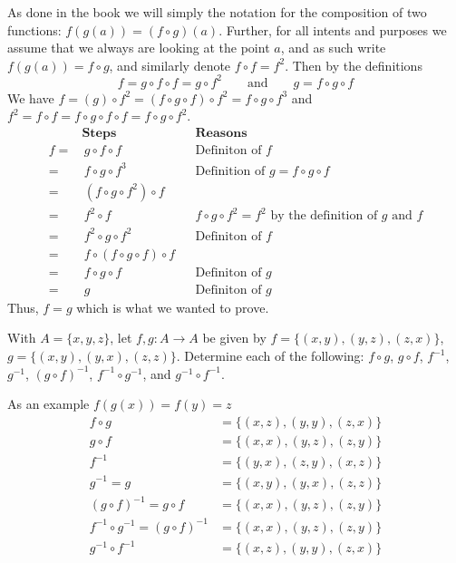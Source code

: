 \documentclass[a4paper, english, 12pt]{article} %
\begin{document}
\begin{answer}
  As done in the book we will simply the notation for the composition of two
  functions: $f(g(a)) = (f \circ g)(a)$. Further, for all intents and purposes
  we assume that we always are looking at the point $a$, and as such write
  $f(g(a)) = f \circ g$, and similarly denote $f \circ f = f^2$. Then by the
  definitions
  \begin{equation*}
    f = g \circ f \circ f = g \circ f^2
    \qquad
    \text{and}
    \qquad
    g = f \circ g \circ f 
  \end{equation*}
  We have $f = (g) \circ f^2 = (f \circ g \circ f) \circ f^2 = f \circ g \circ
  f^3$ and $f^2 =
  f \circ f = f \circ g \circ f \circ f = f \circ g \circ f^2$.
  \begin{align*}
      & \textbf{Steps} && \textbf{Reasons} \\
    f = & \, g \circ f \circ f 
     && \text{Definiton of $f$}  \\
    = & \, f \circ g \circ f^3
     && \text{Definition of $g = f \circ g \circ f$} \\
    = & \, (f \circ g \circ f^2) \circ f
     &&  \\
    = & \, f^2 \circ f
     && \text{$f \circ g \circ f^2 = f^2$ by the definition of $g$ and $f$} \\
    = & \, f^2 \circ g \circ f^2
     && \text{Definiton of $f$} \\
    = & \, f \circ (f \circ g \circ f) \circ f 
     &&  \\
    = & \, f \circ g \circ f 
     && \text{Definiton of $g$} \\
    = & \, g
     && \text{Definiton of $g$}
  \end{align*}
  Thus, $f = g$ which is what we wanted to prove.
\end{answer}

\begin{problem}[27]
  With $A = \{x, y, z\}$, let $f, g \colon A \to A$ be given by $f = \{(x,y),
  (y,z), (z,x)\}$, $g = \{(x, y), (y, x), (z, z)\}$. Determine each of the
  following: $f \circ g$, $g \circ f$, $f^{-1}$, $g^{-1}$, $(g \circ f)^{-1}$,
  $f^{-1}\circ g^{-1}$, and $g^{-1} \circ f^{-1}$.
\end{problem}

\begin{answer}
  As an example $f(g(x)) = f(y) = z$
  \begin{align*}
    f \circ g & = \{ (x,z), (y, y), (z, x) \} \\
    g \circ f & = \{ (x,x), (y,z), (z,y) \} \\
    f^{-1} & = \{(y,x), (z,y), (x,z)\} \\
    g^{-1} = g & = \{(x,y), (y,x), (z,z)\} \\
    (g \circ f)^{-1}  = g \circ f & = \{ (x,x), (y,z), (z,y)\} \\
    f^{-1} \circ g^{-1} = (g \circ f)^{-1} & = \{ (x,x), (y,z), (z, y)\} \\
    g^{-1} \circ f^{-1} & = \{  (x,z), (y,y), (z,x) \} 
  \end{align*}
\end{answer}
\end{document}
